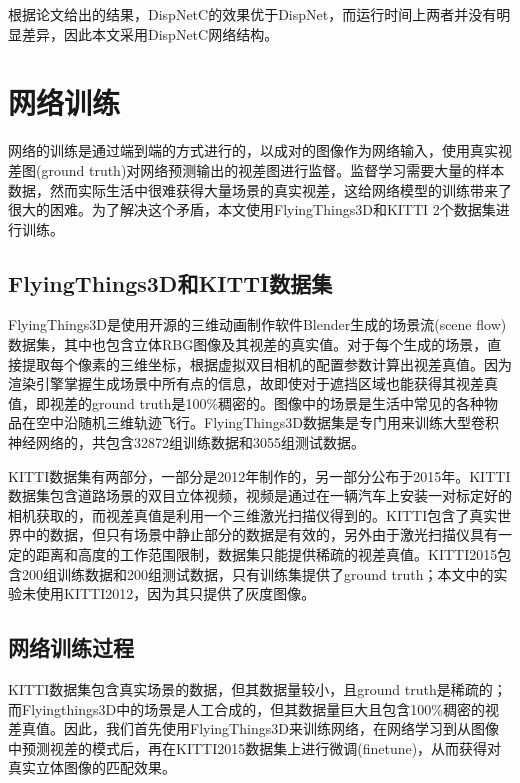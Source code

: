 根据论文\cite{mayer2016large}给出的结果，DispNetC的效果优于DispNet，而运行时间上两者并没有明显差异，因此本文采用DispNetC网络结构。

\section{网络训练}
网络的训练是通过端到端的方式进行的，以成对的图像作为网络输入，使用真实视差图(ground truth)对网络预测输出的视差图进行监督。监督学习需要大量的样本数据，然而实际生活中很难获得大量场景的真实视差，这给网络模型的训练带来了很大的困难。为了解决这个矛盾，本文使用FlyingThings3D和KITTI 2个数据集进行训练。

\subsection{FlyingThings3D和KITTI数据集}
FlyingThings3D\cite{mayer2016large}是使用开源的三维动画制作软件Blender生成的场景流(scene flow)数据集，其中也包含立体RBG图像及其视差的真实值。对于每个生成的场景，直接提取每个像素的三维坐标，根据虚拟双目相机的配置参数计算出视差真值。因为渲染引擎掌握生成场景中所有点的信息，故即使对于遮挡区域也能获得其视差真值，即视差的ground truth是100\%稠密的。图像中的场景是生活中常见的各种物品在空中沿随机三维轨迹飞行。FlyingThings3D数据集是专门用来训练大型卷积神经网络的，共包含32872组训练数据和3055组测试数据。

KITTI数据集有两部分，一部分是2012年制作的\cite{Geiger2012}，另一部分公布于2015年\cite{Menze_2015_CVPR}。KITTI数据集包含道路场景的双目立体视频，视频是通过在一辆汽车上安装一对标定好的相机获取的，而视差真值是利用一个三维激光扫描仪得到的。KITTI包含了真实世界中的数据，但只有场景中静止部分的数据是有效的，另外由于激光扫描仪具有一定的距离和高度的工作范围限制，数据集只能提供稀疏的视差真值。KITTI2015包含200组训练数据和200组测试数据，只有训练集提供了ground truth；本文中的实验未使用KITTI2012，因为其只提供了灰度图像。


\subsection{网络训练过程}
KITTI数据集包含真实场景的数据，但其数据量较小，且ground truth是稀疏的；而Flyingthings3D中的场景是人工合成的，但其数据量巨大且包含100\%稠密的视差真值。因此，我们首先使用FlyingThings3D来训练网络，在网络学习到从图像中预测视差的模式后，再在KITTI2015数据集上进行微调(finetune)，从而获得对真实立体图像的匹配效果。

